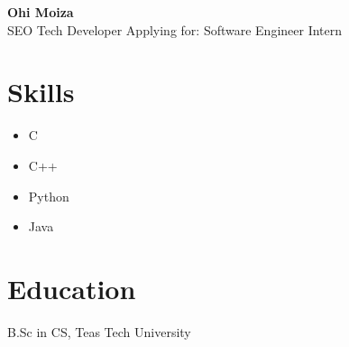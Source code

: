 \documentclass{article}
\begin{document}
\begin{center}
  {\LARGE \textbf{Ohi Moiza}}\\[1em]
  SEO Tech Developer \hfill Applying for: Software Engineer Intern
\end{center}

\section*{Skills}
\begin{itemize}
  \item C
  \item C++
  \item Python
  \item Java
\end{itemize}

\section*{Education}
B.Sc in CS, Teas Tech University
\end{document}
